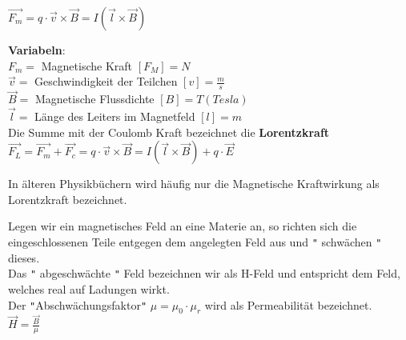 	\formulaBegin
	$\vec{F_m} = q \cdot \vec{v} \times \vec{B} = I(\vec{l} \times \vec{B})$
	\formulaEnd

	\textbf{Variabeln}: \\
	$ F_m = $ Magnetische Kraft $ [F_M] = N$ \\
	$ \vec{v} = $ Geschwindigkeit der Teilchen $ [v] = \frac{m}{s}$ \\
	$ \vec{B} = $ Magnetische Flussdichte $ [B] = T (Tesla)$ \\
	$ \vec{l} = $ Länge des Leiters im Magnetfeld $ [l] = m $\\

	Die Summe mit der Coulomb Kraft bezeichnet die \textbf{Lorentzkraft} \\

		\formulaBegin
		$\vec{F_L} = \vec{F_m} + \vec{F_c} = q \cdot \vec{v} \times \vec{B} = I(\vec{l} \times \vec{B}) + q \cdot \vec{E} $
		\formulaEnd

		In älteren Physikbüchern wird häufig nur die Magnetische Kraftwirkung als Lorentzkraft bezeichnet.

	\iend

\newpage
	\beginip
	Legen wir ein magnetisches Feld an eine Materie an, so richten sich die eingeschlossenen Teile entgegen dem angelegten Feld aus und \texttt{"} schwächen \texttt{"} dieses. \\
	Das \texttt{"} abgeschwächte \texttt{"} Feld bezeichnen wir als H-Feld und entspricht dem Feld, welches real auf Ladungen wirkt. \\
	 Der \texttt{"}Abschwächungsfaktor\texttt{"} $\mu = \mu_0 \cdot \mu_r$ wird als Permeabilität bezeichnet. \\

	\formulaBegin
	$\displaystyle \vec{H} = \frac{\vec{B}}{\mu}$
	\formulaEnd

	\begin{center}
	\end{center}
	\iend

